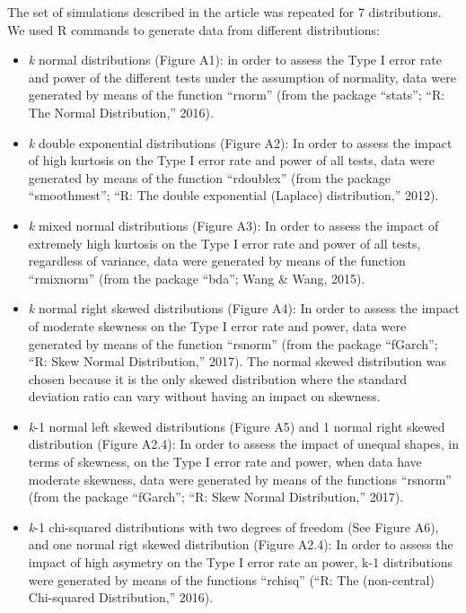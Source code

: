 \begin{appendix}
The set of simulations described in the article was repeated for 7
distributions. We used R commands to generate data from different
distributions:

\begin{itemize}
\item
  \emph{k} normal distributions (Figure A1): in order to assess the Type
  I error rate and power of the different tests under the assumption of
  normality, data were generated by means of the function ``rnorm''
  (from the package ``stats''; ``R: The Normal Distribution,'' 2016).
\item
  \emph{k} double exponential distributions (Figure A2): In order to
  assess the impact of high kurtosis on the Type I error rate and power
  of all tests, data were generated by means of the function
  ``rdoublex'' (from the package ``smoothmest''; ``R: The double
  exponential (Laplace) distribution,'' 2012).
\item
  \emph{k} mixed normal distributions (Figure A3): In order to assess
  the impact of extremely high kurtosis on the Type I error rate and
  power of all tests, regardless of variance, data were generated by
  means of the function ``rmixnorm'' (from the package ``bda''; Wang \&
  Wang, 2015).
\item
  \emph{k} normal right skewed distributions (Figure A4): In order to
  assess the impact of moderate skewness on the Type I error rate and
  power, data were generated by means of the function ``rsnorm'' (from
  the package ``fGarch''; ``R: Skew Normal Distribution,'' 2017). The
  normal skewed distribution was chosen because it is the only skewed
  distribution where the standard deviation ratio can vary without
  having an impact on skewness.
\item
  \emph{k}-1 normal left skewed distributions (Figure A5) and 1 normal
  right skewed distribution (Figure A2.4): In order to assess the impact
  of unequal shapes, in terms of skewness, on the Type I error rate and
  power, when data have moderate skewness, data were generated by means
  of the functions ``rsnorm'' (from the package ``fGarch''; ``R: Skew
  Normal Distribution,'' 2017).
\item
  \emph{k}-1 chi-squared distributions with two degrees of freedom (See
  Figure A6), and one normal rigt skewed distribution (Figure A2.4): In
  order to assess the impact of high asymetry on the Type I error rate
  an power, k-1 distributions were generated by means of the functions
  ``rchisq'' (``R: The (non-central) Chi-squared Distribution,'' 2016).

\end{itemize}
\end{appendix}
